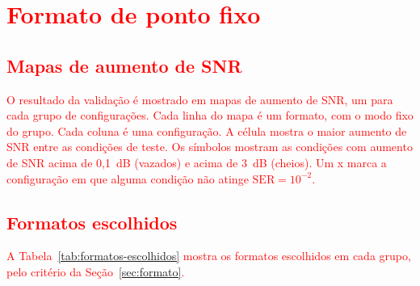 \section{\texorpdfstring{\textcolor{red}{Formato de ponto fixo}}{Formato de ponto fixo}}\label{sec:resultados-formato}

\subsection{\texorpdfstring{\textcolor{red}{Mapas de aumento de SNR}}{Mapas de aumento de SNR}}\label{subsec:mapas-perda}
\textcolor{red}{O resultado da validação é mostrado em mapas de aumento de SNR, um para cada grupo de configurações. Cada linha do mapa é um formato, com o modo fixo do grupo. Cada coluna é uma configuração. A célula mostra o maior aumento de SNR entre as condições de teste. Os símbolos mostram as condições com aumento de SNR acima de 0,1~dB (vazados) e acima de 3~dB (cheios). Um x marca a configuração em que alguma condição não atinge $\mathrm{SER} = 10^{-2}$.}

\subsection{\texorpdfstring{\textcolor{red}{Formatos escolhidos}}{Formatos escolhidos}}\label{subsec:formatos-escolhidos}
\textcolor{red}{A Tabela~\ref{tab:formatos-escolhidos} mostra os formatos escolhidos em cada grupo, pelo critério da Seção~\ref{sec:formato}.}

